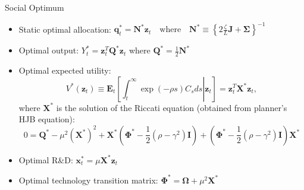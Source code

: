 \documentclass[
  10pt,
  aspectratio=169,   %
]{beamer}
\theoremstyle{plain}
\begin{document}
\begin{frame}{Social Optimum}
  \label{optimal}
  \begin{itemize}
    \item Static optimal allocation: $\bm{q}_{t}^{*}=\bm{N}^{*}\bm{z}_{t}\quad\text{where}\quad \bm{N}^{*}\equiv\left\{ 2\frac{\zeta}{L}\bm{J}+\bm{\Sigma}\right\} ^{-1}$
    \item Optimal output: $Y_{t}^{*}=\bm{z}_{t}^{T}\bm{Q}^{*}\bm{z}_{t}$ where $\bm{Q}^{*}=\frac{1}{2}\bm{N}^{*}$
    \item Optimal expected utility:
          \[
            V^{*}\left(\bm{z}_{t}\right)\equiv\bm{E}_{t}\left[\left.\int_{t}^{\infty}\exp\left(-\rho s\right)C_{s}ds\right|\bm{z}_{t}\right]=\bm{z}_{t}^{T}\bm{X}^{*}\bm{z}_{t},
          \]
          where $\bm{X}^{*}$ is the solution of the Riccati equation (obtained from planner's HJB equation):
          \[
            0=\bm{Q}^{*}-\mu^{2}\left(\bm{X}^{*}\right)^{2}+\bm{X}^{*}\left(\bm{\Phi}^{*}-\frac{1}{2}\left(\rho-\gamma^{2}\right)\bm{I}\right)+\left(\bm{\Phi}^{*}-\frac{1}{2}\left(\rho-\gamma^{2}\right)\bm{I}\right)\bm{X}^{*}
          \]
    \item Optimal R\&D: $\bm{x}_{t}^{*}=\mu \bm{X}^{*}\bm{z}_{t}$
    \item Optimal technology transition matrix: $\bm{\Phi}^{*}=\bm{\Omega}+\mu^{2}\bm{X}^{*}$
  \end{itemize}
  \hyperlink{aggregation}{}
\end{frame}
\end{document}
